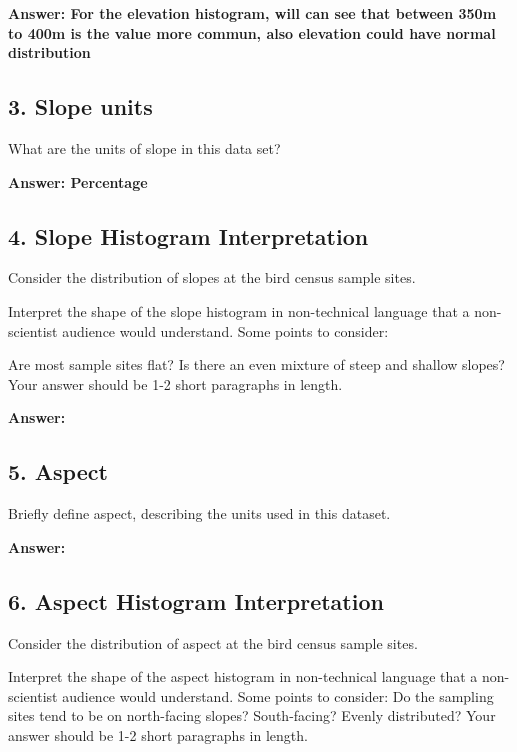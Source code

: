 \documentclass[
]{article}
\begin{document}
\textbf{Answer: For the elevation histogram, will can see that between
350m to 400m is the value more commun, also elevation could have normal
distribution}

\hypertarget{slope-units}{%
\subsection{\texorpdfstring{3. \textbf{Slope
units}}{3. Slope units}}\label{slope-units}}

What are the units of slope in this data set?

\textbf{Answer: Percentage }

\hypertarget{slope-histogram-interpretation}{%
\subsection{\texorpdfstring{\textbf{4. Slope Histogram
Interpretation}}{4. Slope Histogram Interpretation}}\label{slope-histogram-interpretation}}

Consider the distribution of slopes at the bird census sample sites.

Interpret the shape of the slope histogram in non-technical language
that a non-scientist audience would understand. Some points to consider:

Are most sample sites flat? Is there an even mixture of steep and
shallow slopes? Your answer should be 1-2 short paragraphs in length.

\textbf{Answer: }

\hypertarget{aspect}{%
\subsection{5. Aspect}\label{aspect}}

Briefly define aspect, describing the units used in this dataset.

\textbf{Answer: }

\hypertarget{aspect-histogram-interpretation}{%
\subsection{\texorpdfstring{6. \textbf{Aspect Histogram
Interpretation}}{6. Aspect Histogram Interpretation}}\label{aspect-histogram-interpretation}}

Consider the distribution of aspect at the bird census sample sites.

Interpret the shape of the aspect histogram in non-technical language
that a non-scientist audience would understand. Some points to consider:
Do the sampling sites tend to be on north-facing slopes? South-facing?
Evenly distributed? Your answer should be 1-2 short paragraphs in
length.
\end{document}
